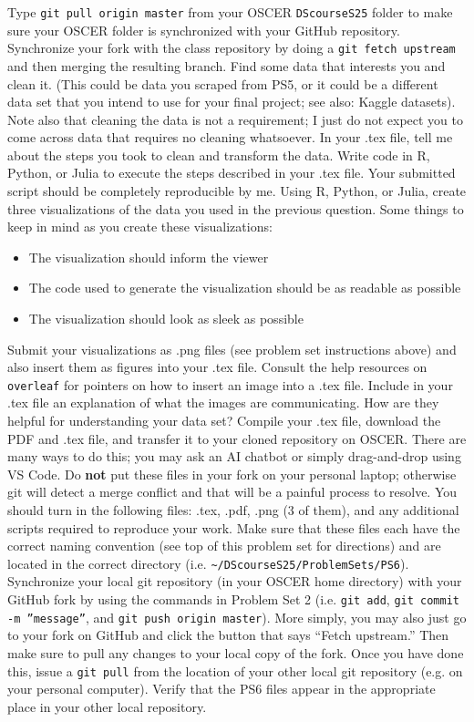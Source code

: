\documentclass[12pt,english]{exam}
\begin{document}
\begin{questions}
\question Type \texttt{git pull origin master} from your OSCER \texttt{DScourseS25} folder to make sure your OSCER folder is synchronized with your GitHub repository. 
\question Synchronize your fork with the class repository by doing a \texttt{git fetch upstream} and then merging the resulting branch. 
\question Find some data that interests you and clean it. (This could be data you scraped from PS5, or it could be a different data set that you intend to use for your final project; see also: Kaggle datasets). Note also that cleaning the data is not a requirement; I just do not expect you to come across data that requires no cleaning whatsoever. In your .tex file, tell me about the steps you took to clean and transform the data.
Write code in R, Python, or Julia to execute the steps described in your .tex file. Your submitted script should be completely reproducible by me.
\question Using R, Python, or Julia, create three visualizations of the data you used in the previous question. Some things to keep in mind as you create these visualizations:
\begin{itemize}
    \item The visualization should inform the viewer
    \item The code used to generate the visualization should be as readable as possible
    \item The visualization should look as sleek as possible
\end{itemize}
Submit your visualizations as .png files (see problem set instructions above) and also insert them as figures into your .tex file. Consult the help resources on \texttt{overleaf} for pointers on how to insert an image into a .tex file.
\question Include in your .tex file an explanation of what the images are communicating. How are they helpful for understanding your data set?
\question Compile your .tex file, download the PDF and .tex file, and transfer it to your cloned repository on OSCER. There are many ways to do this;  you may ask an AI chatbot or simply drag-and-drop using VS Code. Do \textbf{not} put these files in your fork on your personal laptop; otherwise git will detect a merge conflict and that will be a painful process to resolve.
\question You should turn in the following files: .tex, .pdf, .png (3 of them), and any additional scripts required to reproduce your work.  Make sure that these files each have the correct naming convention (see top of this problem set for directions) and are located in the correct directory (i.e. \texttt{\textasciitilde/DScourseS25/ProblemSets/PS6}).
\question Synchronize your local git repository (in your OSCER home directory) with your GitHub fork by using the commands in Problem Set 2 (i.e. \texttt{git add}, \texttt{git commit -m ''message''}, and \texttt{git push origin master}). More simply, you may also just go to your fork on GitHub and click the button that says ``Fetch upstream.'' Then make sure to pull any changes to your local copy of the fork. Once you have done this, issue a \texttt{git pull} from the location of your other local git repository (e.g. on your personal computer). Verify that the PS6 files appear in the appropriate place in your other local repository.
\end{questions}
\end{document}
